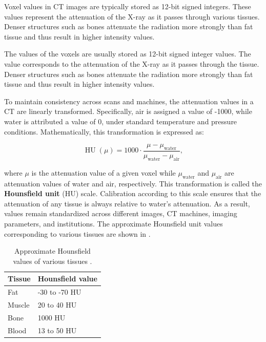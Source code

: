 Voxel values in CT images are typically stored as 12-bit signed integers. These values represent the attenuation of the X-ray as it passes through various tissues. Denser structures such as bones attenuate the radiation more strongly than fat tissue and thus result in higher intensity values.

The values of the voxels are usually stored as 12-bit signed integer values. The value corresponds to the attenuation of the X-ray as it passes through the tissue. Denser structures such as bones attenuate the radiation more strongly than fat tissue and thus result in higher intensity values. 

To maintain consistency across scans and machines, the attenuation values in a CT are linearly transformed. Specifically, air is assigned a value of -1000, while water is attributed a value of 0, under standard temperature and pressure conditions. Mathematically, this transformation is expressed as:


\begin{equation}
	{\operatorname{HU}(\mu)}=1000 \cdot {\frac {\mu -\mu _{\textrm {water}}}{\mu _{\textrm {water}}-\mu _{\textrm {air}}}},
\end{equation}

where $\mu$ is the attenuation value of a given voxel while $\mu_{\textrm {water}}$ and $\mu_{\textrm {air}}$ are attenuation values of water and air, respectively. This transformation is called the \textbf{Hounsfield unit} (HU) scale. Calibration according to this scale ensures that the attenuation of any tissue is always relative to water's attenuation. As a result, values remain standardized across different images, CT machines, imaging parameters, and institutions. The approximate Hounsfield unit values corresponding to various tissues are shown in .

\begin{table}[h!]
\centering
\begin{tabular}{l l} 
 \hline
 \textbf{Tissue} & \textbf{Hounsfield value} \\
 \hline
 Fat & -30 to -70 HU\\
 Muscle & 20 to 40 HU\\
 Bone & 1000 HU \\
 Blood & 13 to 50 HU\\
 \hline
\end{tabular}
\caption{Approximate Hounsfield values of various tissues \cite{fosbinder2011essentials, kamalianComputedTomographyImaging2016}.}
\label{tab:hu-tissues}
\end{table}

